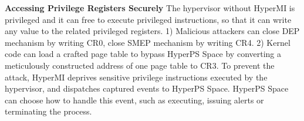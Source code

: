 \fi

\textbf{Accessing Privilege Registers Securely}
The hypervisor without HyperMI is privileged and it can free to execute privileged instructions, so that it can write any value to the related privileged registers. 1) Malicious attackers can close DEP mechanism by writing CR0, close SMEP mechanism by writing CR4. 2) Kernel code can load a crafted page table to bypass HyperPS Space by converting a meticulously constructed address of one page table to CR3.
To prevent the attack, HyperMI deprives sensitive privilege instructions executed by the hypervisor, and dispatches captured events to HyperPS Space. HyperPS Space can choose how to handle this event, such as executing, issuing alerts or terminating the process. 

